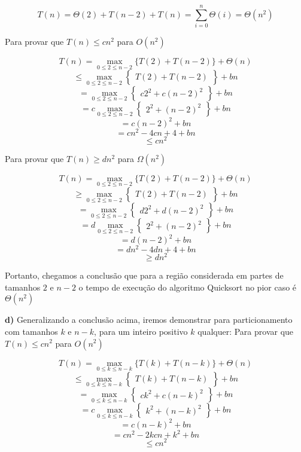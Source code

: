 \documentclass[a4paper,12pt]{article}
\begin{document}
\begin{description}
	$$
		T(n) = \Theta(2) + T(n-2) + T(n) = \sum_{i=0}^{n} \Theta(i) = \Theta(n^2)
	$$
	
	Para provar que $T(n) \leq cn^2$ para $O(n^2)$
	
	$$ T(n) = \max_{0 \leq2 \leq n-2} \{T(2)+T(n-2)\}+\Theta(n) $$
	$$
	{\leq} \max_{0 \leq2 \leq n-2} \left\{\begin{array}{rc}
	T(2)+T(n-2)
	\end{array}\right\} + bn
	$$ 
	$$
	=\max_{0 \leq2 \leq n-2} \left\{\begin{array}{rc}
	c2^2+c(n-2)^2
	\end{array}\right\} + bn
	$$ 
	$$
	=c \max_{0 \leq2 \leq n-2} \left\{\begin{array}{rc}
	2^2+(n-2)^2
	\end{array}\right\} + bn
	$$ 
	$$=c (n-2)^2 + bn$$
	$$ =cn^2-4cn + 4 + bn $$
	$$ {\leq} cn^2 $$
	
	Para provar que $T(n) \ge dn^2$ para $\Omega(n^2)$
	
	$$ T(n) = \max_{0 \leq2 \leq n-2} \{T(2)+T(n-2)\}+\Theta(n) $$
	$$
	{\ge} \max_{0 \leq2 \leq n-2} \left\{\begin{array}{rc}
	T(2)+T(n-2)
	\end{array}\right\} + bn
	$$ 
	$$
	=\max_{0 \leq2 \leq n-2} \left\{\begin{array}{rc}
	d2^2+d(n-2)^2
	\end{array}\right\} + bn
	$$ 
	$$
	=d \max_{0 \leq2 \leq n-2} \left\{\begin{array}{rc}
	2^2+(n-2)^2
	\end{array}\right\} + bn
	$$ 
	$$=d (n-2)^2 + bn$$
	$$ =dn^2-4dn + 4 + bn $$
	$$ {\ge} dn^2 $$
	
	Portanto, chegamos a conclusão que para a região considerada em partes de tamanhos $2$ e $n-2$ o tempo de execução do algoritmo Quicksort no pior caso é $\Theta(n^2)$
	
	
	\item{\textbf{d)}} Generalizando a conclusão acima, iremos demonstrar para particionamento com tamanhos $k$ e $n-k$, para um inteiro positivo $k$ qualquer:
	Para provar que $T(n) \leq cn^2$ para $O(n^2)$
	
	$$ T(n) = \max_{0 \leq k \leq n-k} \{T(k)+T(n-k)\}+\Theta(n) $$
	$$
	{\leq} \max_{0 \leq k \leq n-k} \left\{\begin{array}{rc}
	T(k)+T(n-k)
	\end{array}\right\} + bn
	$$ 
	$$
	=\max_{0 \leq k \leq n-k} \left\{\begin{array}{rc}
	ck^2+c(n-k)^2
	\end{array}\right\} + bn
	$$ 
	$$
	=c \max_{0 \leq k \leq n-k} \left\{\begin{array}{rc}
	k^2+(n-k)^2
	\end{array}\right\} + bn
	$$ 
	$$=c (n-k)^2 + bn$$
	$$ =cn^2-2kcn + k^2 + bn $$
	$$ {\leq} cn^2 $$
	

\end{description}
\end{document}

